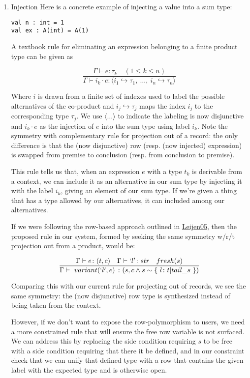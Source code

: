 \documentclass[11pt]{article}
\begin{document}
\begin{enumerate}
\item Injection
\label{sec:orgc77f012}
Here is a concrete example of injecting a value into a sum type:

\begin{verbatim}
val n : int = 1
val ex : A(int) = A(1)
\end{verbatim}

A textbook rule for eliminating an expression belonging to a finite
product type can be given as

$$
\frac
{ \Gamma \vdash e \colon \tau_k  \quad (1 \le k \le n)}
{ \Gamma \vdash i_k \cdot e \colon \langle i_1 \hookrightarrow \tau_1, \ \ldots, \ i_n \hookrightarrow \tau_n \rangle }
$$

Where \(i\) is drawn from a finite set of indexes used to label the
possible alternatives of the co-product and
\(i_j \hookrightarrow \tau_j\) maps the index \(i_j\) to the
corresponding type \(\tau_j\). We use \(\langle \ldots \rangle\) to
indicate the labeling is now disjunctive and \(i_k \cdot e\) as the
injection of \(e\) into the sum type using label \(i_k\). Note the
symmetry with complementary rule for projection out of a record: the
only difference is that the (now disjunctive) row (resp. (now injected)
expression) is swapped from premise to conclusion (resp. from conclusion
to premise).

This rule tells us that, when an expression \(e\) with a type \(t_k\) is
derivable from a context, we can include it as an alternative in our sum
type by injecting it with the label \(i_k\), giving an element of our
sum type. If we're given a thing that has a type allowed by our
alternatives, it can included among our alternatives.

If we were following the row-based approach outlined in
\href{https://www.microsoft.com/en-us/research/publication/extensible-records-with-scoped-labels/}{Leijen05},
then the proposed rule in our system, formed by seeking the same
symmetry w/r/t projection out from a product, would be:

$$
\frac
{ \Gamma \vdash e \colon (t, c) \quad \Gamma \vdash `l' \colon str \quad fresh(s) }
{ \Gamma \vdash \ variant(`l', e) \ \colon (s, c \land s \sim \{ \ l \colon t | tail\_s \ \}) }
$$

Comparing this with our current rule for projecting out of records, we
see the same symmetry: the (now disjunctive) row type is synthesized
instead of being taken from the context.

However, if we don't want to expose the row-polymorphism to users, we need a
more constrained rule that will ensure the free row variable is not surfaced. We
can address this by replacing the side condition requiring \(s\) to be free with a side
condition requiring that there it be defined, and in our constraint check that
we can unify that defined type with a row that contains the given label with the
expected type and is otherwise open.


\end{enumerate}
\end{document}
